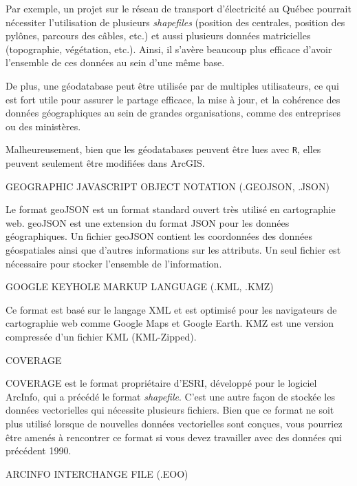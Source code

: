 \documentclass[
  12pt,
]{krantz}
\renewenvironment{quote}{\begin{VF}}{\end{VF}}
\begin{document}
Par exemple, un projet sur le réseau de transport d'électricité au Québec pourrait nécessiter l'utilisation de plusieurs \emph{shapefiles} (position des centrales, position des pylônes, parcours des câbles, etc.) et aussi plusieurs données matricielles (topographie, végétation, etc.). Ainsi, il s'avère beaucoup plus efficace d'avoir l'ensemble de ces données au sein d'une même base.

De plus, une géodatabase peut être utilisée par de multiples utilisateurs, ce qui est fort utile pour assurer le partage efficace, la mise à jour, et la cohérence des données géographiques au sein de grandes organisations, comme des entreprises ou des ministères.

Malheureusement, bien que les géodatabases peuvent être lues avec \texttt{R}, elles peuvent seulement être modifiées dans ArcGIS.

\begin{quote}
GEOGRAPHIC JAVASCRIPT OBJECT NOTATION (.GEOJSON, .JSON)
\end{quote}

Le format geoJSON est un format standard ouvert très utilisé en cartographie web. geoJSON est une extension du format JSON pour les données géographiques. Un fichier geoJSON contient les coordonnées des données géospatiales ainsi que d'autres informations sur les attributs. Un seul fichier est nécessaire pour stocker l'ensemble de l'information.

\begin{quote}
GOOGLE KEYHOLE MARKUP LANGUAGE (.KML, .KMZ)
\end{quote}

Ce format est basé sur le langage XML et est optimisé pour les navigateurs de cartographie web comme Google Maps et Google Earth. KMZ est une version compressée d'un fichier KML (KML-Zipped).

\begin{quote}
COVERAGE
\end{quote}

COVERAGE est le format propriétaire d'ESRI, développé pour le logiciel ArcInfo, qui a précédé le format \emph{shapefile}. C'est une autre façon de stockée les données vectorielles qui nécessite plusieurs fichiers. Bien que ce format ne soit plus utilisé lorsque de nouvelles données vectorielles sont conçues, vous pourriez être amenés à rencontrer ce format si vous devez travailler avec des données qui précédent 1990.

\begin{quote}
ARCINFO INTERCHANGE FILE (.EOO)
\end{quote}
\end{document}
